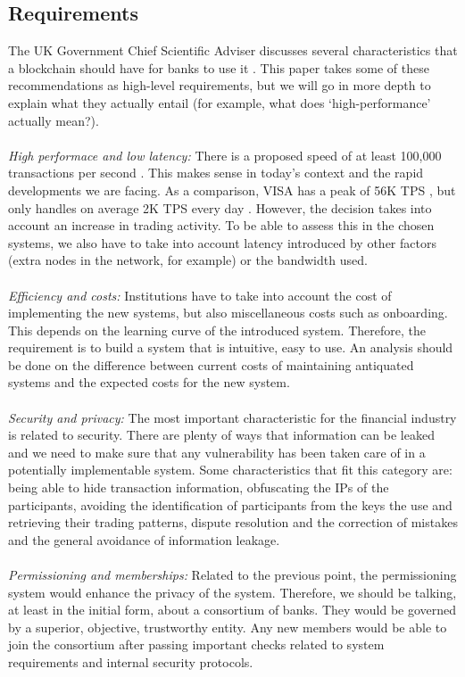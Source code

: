 \documentclass[12pt,twoside]{article}
\begin{document}
\subsection{Requirements}
\label{sub:Requirements}
The UK Government Chief Scientific Adviser discusses several characteristics that a blockchain should have for banks to use it \cite{GOVReq}. This paper takes some of these recommendations as high-level requirements, but we will go in more depth to explain what they actually entail (for example, what does `high-performance' actually mean?). 
\\ \\
\textit{High performace and low latency:} There is a proposed speed of at least 100,000 transactions per second \cite{Chinese}. This makes sense in today's context and the rapid developments we are facing. As a comparison, VISA has a peak of 56K TPS \cite{visa}, but only handles on average 2K TPS every day \cite{Scalability}. However, the decision takes into account an increase in trading activity. To be able to assess this in the chosen systems, we also have to take into account latency introduced by other factors (extra nodes in the network, for example) or the bandwidth used. 
\\ \\
\textit{Efficiency and costs:} Institutions have to take into account the cost of implementing the new systems, but also miscellaneous costs such as onboarding. This depends on the learning curve of the introduced system. Therefore, the requirement is to build a system that is intuitive, easy to use. An analysis should be done on the difference between current costs of maintaining antiquated systems and the expected costs for the new system.
\\ \\
\textit{Security and privacy:} The most important characteristic for the financial industry is related to security. There are plenty of ways that information can be leaked and we need to make sure that any vulnerability has been taken care of in a potentially implementable system. Some characteristics that fit this category are: being able to hide transaction information, obfuscating the IPs of the participants, avoiding the identification of participants from the keys the use and retrieving their trading patterns, dispute resolution and the correction of mistakes and the general avoidance of information leakage. 
\\ \\
\textit{Permissioning and memberships:} Related to the previous point, the permissioning system would enhance the privacy of the system. Therefore, we should be talking, at least in the initial form, about a consortium of banks. They would be governed by a superior, objective, trustworthy entity. Any new members would be able to join the consortium after passing important checks related to system requirements and internal security protocols.
\end{document}

